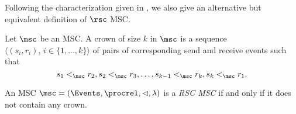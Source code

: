 Following the characterization given in \cite[Theorem 4.4]{DBLP:journals/dc/Charron-BostMT96}, we also give an alternative but equivalent definition of $\rsc$ MSC.

\begin{definition}
	Let $\msc$ be an MSC. A crown of size $k$ in $\msc$ is a sequence $\langle(s_i,r_i),\, i \in \{1,\dots,k\}\rangle$ of pairs of corresponding send and receive events such that
	\[
		s_1 <_\msc r_2, s_2 <_\msc r_3, \dots, s_{k-1} <_\msc r_k, s_k <_\msc r_1.
	\]
\end{definition}

\begin{definition} %
	An MSC $\msc = (\Events,\procrel,\lhd,\lambda)$ is a \emph{RSC MSC} if and only if it does not contain any crown.
\end{definition}

\medskip


